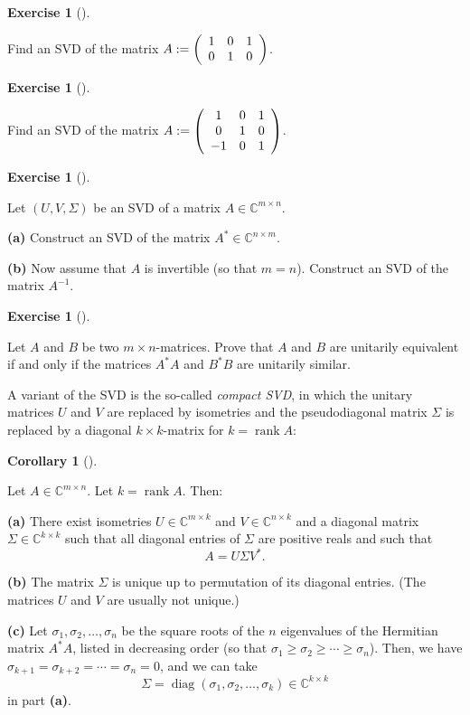\documentclass[numbers=enddot,12pt,final,onecolumn,notitlepage]{scrartcl}%
\newcounter{exer}
\numberwithin{exer}{subsection}
\theoremstyle{definition}
\newtheorem{coro}[theo]{Corollary}
\newenvironment{corollary}[1][]
{\begin{coro}[#1]\begin{leftbar}}
{\end{leftbar}\end{coro}}
\newtheorem{exmp}[exer]{Exercise}
\newenvironment{exercise}[1][]
{\begin{exmp}[#1]\begin{leftbar}}
{\end{leftbar}\end{exmp}}
\begin{document}
\begin{exercise}
 Find an SVD of the matrix $A:=\left(
\begin{array}
[c]{ccc}%
1 & 0 & 1\\
0 & 1 & 0
\end{array}
\right)  $.
\end{exercise}

\begin{exercise}
 Find an SVD of the matrix $A:=\left(
\begin{array}
[c]{ccc}%
1 & 0 & 1\\
0 & 1 & 0\\
-1 & 0 & 1
\end{array}
\right)  $.
\end{exercise}

\begin{exercise}
 Let $\left(  U,V,\Sigma\right)  $ be an SVD of a matrix
$A\in\mathbb{C}^{m\times n}$. \medskip

\textbf{(a)} Construct an SVD of the matrix $A^{\ast}\in\mathbb{C}^{n\times
m}$. \medskip

\textbf{(b)} Now assume that $A$ is invertible (so that $m=n$). Construct an
SVD of the matrix $A^{-1}$.
\end{exercise}

\begin{exercise}
 Let $A$ and $B$ be two $m\times n$-matrices. Prove that $A$ and $B$
are unitarily equivalent if and only if the matrices $A^{\ast}A$ and $B^{\ast
}B$ are unitarily similar.
\end{exercise}

A variant of the SVD is the so-called \emph{compact SVD}, in which the unitary
matrices $U$ and $V$ are replaced by isometries and the pseudodiagonal matrix
$\Sigma$ is replaced by a diagonal $k\times k$-matrix for
$k=\operatorname*{rank}A$:

\begin{corollary}
\label{cor.svd.compact-svd}Let $A\in\mathbb{C}^{m\times n}$. Let
$k=\operatorname*{rank}A$. Then: \medskip

\textbf{(a)} There exist isometries $U\in\mathbb{C}^{m\times k}$ and
$V\in\mathbb{C}^{n\times k}$ and a diagonal matrix $\Sigma\in\mathbb{C}%
^{k\times k}$ such that all diagonal entries of $\Sigma$ are positive reals
and such that%
\[
A=U\Sigma V^{\ast}.
\]


\textbf{(b)} The matrix $\Sigma$ is unique up to permutation of its diagonal
entries. (The matrices $U$ and $V$ are usually not unique.) \medskip

\textbf{(c)} Let $\sigma_{1},\sigma_{2},\ldots,\sigma_{n}$ be the square roots
of the $n$ eigenvalues of the Hermitian matrix $A^{\ast}A$, listed in
decreasing order (so that $\sigma_{1}\geq\sigma_{2}\geq\cdots\geq\sigma_{n}$).
Then, we have $\sigma_{k+1}=\sigma_{k+2}=\cdots=\sigma_{n}=0$, and we can
take
\[
\Sigma=\operatorname*{diag}\left(  \sigma_{1},\sigma_{2},\ldots,\sigma
_{k}\right)  \in\mathbb{C}^{k\times k}%
\]
in part \textbf{(a)}.
\end{corollary}
\end{document}

